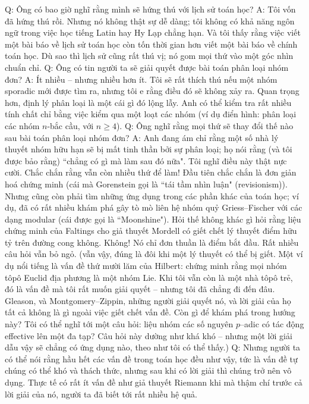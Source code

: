 \begin{multicols}{2}
	\vskip 0.1cm
	Q: Ông có bao giờ nghĩ rằng mình sẽ hứng thú với lịch sử toán học?
	\vskip 0.1cm
	A: Tôi vốn đã hứng thú rồi. Nhưng nó không thật sự dễ dàng; tôi không có khả năng ngôn ngữ trong việc học tiếng Latin hay Hy Lạp chẳng hạn. Và tôi thấy rằng việc viết một bài báo về lịch sử toán học còn tốn thời gian hơn viết một bài báo về chính toán học. Dù sao thì lịch sử cũng rất thú vị; nó gom mọi thứ vào một góc nhìn chuẩn chỉ.
	\vskip 0.1cm
	Q: Ông có tin người ta sẽ giải quyết được bài toán phân loại nhóm đơn? 
	\vskip 0.1cm
	A: Ít nhiều -- nhưng nhiều hơn ít. Tôi sẽ rất thích thú nếu một nhóm sporadic mới được tìm ra, nhưng tôi e rằng điều đó sẽ không xảy ra.
	\vskip 0.1cm
	Quan trọng hơn, định lý phân loại là một cái gì đó lộng lẫy. Anh có thể kiểm tra rất nhiều tính chất chỉ bằng việc kiểm qua một loạt các nhóm (ví dụ điển hình: phân loại các nhóm $n$-bắc cầu, với $n \geq 4$).
	\vskip 0.1cm
	Q: Ông nghĩ rằng mọi thứ sẽ thay đổi thế nào sau bài toán phân loại nhóm đơn?
	\vskip 0.1cm
	A: Anh đang ám chỉ rằng một số nhà lý thuyết nhóm hữu hạn sẽ bị mất tinh thần bởi sự phân loại; họ nói rằng (và tôi được bảo rằng) ``chẳng có gì mà làm sau đó nữa". Tôi nghĩ điều này thật nực cười. Chắc chắn rằng vẫn còn nhiều thứ để làm! Đầu tiên chắc chắn là đơn giản hoá chứng minh (cái mà Gorenstein gọi là ``tái tầm nhìn luận" (revisionism)). Nhưng cũng còn phải tìm những ứng dụng trong các phần khác của toán học; ví dụ, đã có rất nhiều khám phá gây tò mò liên hệ nhóm quỷ Griess--Fischer với các dạng modular (cái được gọi là ``Moonshine"). 
	\vskip 0.1cm
	Hỏi thế không khác gì hỏi rằng liệu chứng minh của Faltings cho giả thuyết Mordell có giết chết lý thuyết điểm hữu tỷ trên đường cong không. Không! Nó chỉ đơn thuần là điểm bắt đầu. Rất nhiều câu hỏi vẫn bỏ ngỏ.
	\vskip 0.1cm
	(vẫn vậy, đúng là đôi khi một lý thuyết có thể bị giết. Một ví dụ nổi tiếng là vấn đề thứ mười lăm của Hilbert: chứng minh rằng mọi nhóm tôpô Euclid địa phương là một nhóm Lie. Khi tôi vẫn còn là một nhà tôpô trẻ, đó là vấn đề mà tôi rất muốn giải quyết -- nhưng tôi đã chẳng đi đến đâu. Gleason, và Montgomery--Zippin, những người giải quyết nó, và lời giải của họ tất cả không là gì ngoài việc giết chết vấn đề. Còn gì để khám phá trong hướng này? Tôi có thể nghĩ tới một câu hỏi: liệu nhóm các số nguyên $p$--adic có tác động effective lên một đa tạp? Câu hỏi này dường như khá khó -- nhưng một lời giải dẫu vậy sẽ chẳng có ứng dụng nào, theo như tôi có thể thấy.) 
	\vskip 0.1cm
	Q: Nhưng người ta có thể nói rằng hầu hết các vấn đề trong toán học đều như vậy, tức là vấn đề tự chúng có thể khó và thách thức, nhưng sau khi có lời giải thì chúng trở nên vô dụng. Thực tế có rất ít vấn đề như giả thuyết Riemann khi mà thậm chí trước cả lời giải của nó, người ta đã biết tới rất nhiều hệ quả. 

\end{multicols}
